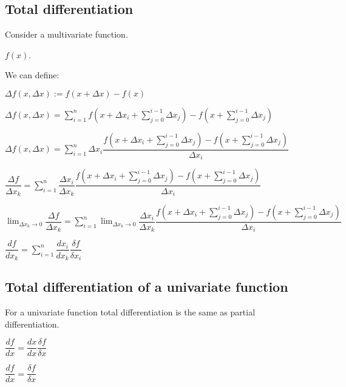 
\subsection{Total differentiation}

Consider a multivariate function.

\(f(x)\).

We can define:

\(\Delta f(x, \Delta x):=f(x+\Delta x)-f(x)\)

\(\Delta f(x, \Delta x)=\sum_{i=1}^nf(x+\Delta x_i+\sum_{j=0}^{i-1}\Delta x_j)-f(x+\sum_{j=0}^{i-1}\Delta x_j)\)

\(\Delta f(x, \Delta x)=\sum_{i=1}^n\Delta x_i \dfrac{f(x+\Delta x_i+\sum_{j=0}^{i-1}\Delta x_j)-f(x+\sum_{j=0}^{i-1}\Delta x_j)}{\Delta x_i}\)

\(\dfrac{\Delta f}{\Delta x_k}=\sum_{i=1}^n\dfrac{\Delta x_i}{\Delta x_k} \dfrac{f(x+\Delta x_i+\sum_{j=0}^{i-1}\Delta x_j)-f(x+\sum_{j=0}^{i-1}\Delta x_j)}{\Delta x_i}\)

\(\lim_{\Delta x_k \rightarrow 0}\dfrac{\Delta f}{\Delta x_k}=\sum_{i=1}^n\lim_{\Delta x_k \rightarrow 0}\dfrac{\Delta x_i}{\Delta x_k} \dfrac{f(x+\Delta x_i+\sum_{j=0}^{i-1}\Delta x_j)-f(x+\sum_{j=0}^{i-1}\Delta x_j)}{\Delta x_i}\)

\(\dfrac{df}{dx_k}=\sum_{i=1}^n\dfrac{dx_i}{dx_k} \dfrac{\delta f}{\delta x_i}\)

\subsection{Total differentiation of a univariate function}

For a univariate function total differentiation is the same as partial differentiation.

\(\dfrac{df}{dx}=\dfrac{dx}{dx} \dfrac{\delta f}{\delta x}\)

\(\dfrac{df}{dx}=\dfrac{\delta f}{\delta x}\)

